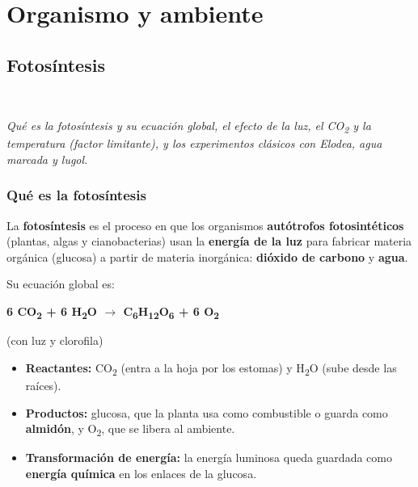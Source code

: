 
\chapter{Organismo y ambiente}
\section[Fotosíntesis]{Fotosíntesis}
\modcomun\ \ {\color{gris}\itshape Qué es la fotosíntesis y su ecuación global, el efecto de la luz, el CO\textsubscript{2} y la temperatura (factor limitante), y los experimentos clásicos con Elodea, agua marcada y lugol.\par}
\subsection{Qué es la fotosíntesis}
La \textbf{fotosíntesis} es el proceso en que los organismos \textbf{autótrofos fotosintéticos} (plantas, algas y cianobacterias) usan la \textbf{energía de la luz} para fabricar materia orgánica (glucosa) a partir de materia inorgánica: \textbf{dióxido de carbono} y \textbf{agua}.

 

Su ecuación global es:

 
\begin{center}
\textbf{6 CO\textsubscript{2} + 6 H\textsubscript{2}O \ensuremath{\rightarrow} C\textsubscript{6}H\textsubscript{12}O\textsubscript{6} + 6 O\textsubscript{2}}\par \textcolor{gris}{(con luz y clorofila)}
\end{center}
 
\begin{itemize}
  \item \textbf{Reactantes:} CO\textsubscript{2} (entra a la hoja por los estomas) y H\textsubscript{2}O (sube desde las raíces).
  \item \textbf{Productos:} glucosa, que la planta usa como combustible o guarda como \textbf{almidón}, y O\textsubscript{2}, que se libera al ambiente.
  \item \textbf{Transformación de energía:} la energía luminosa queda guardada como \textbf{energía química} en los enlaces de la glucosa.
\end{itemize}
  
